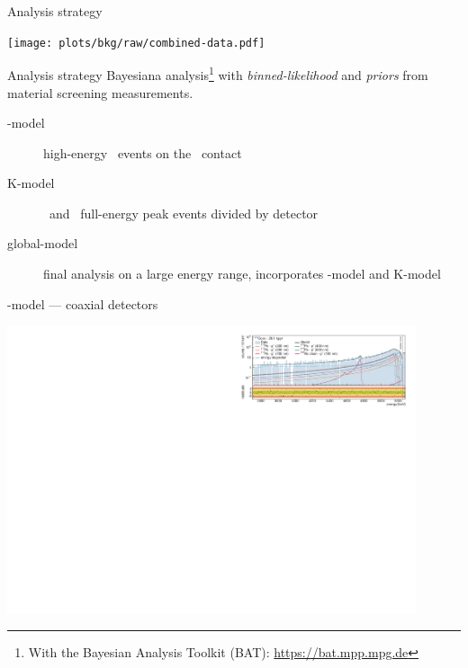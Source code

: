 \documentclass[10pt,aspectratio=169]{beamer}
\begin{document}
\begin{frame}{Analysis strategy}
  \begin{center}
    \texttt{[image: plots/bkg/raw/combined-data.pdf]}
  \end{center}
\end{frame}
\begin{frame}{Analysis strategy}
  \alert{Bayesiana} analysis\footnote{With the Bayesian Analysis Toolkit (BAT):
  \url{https://bat.mpp.mpg.de}} with \emph{binned-likelihood} and \emph{priors}
  from material screening measurements.
  \begin{description}
    \item[\a-model] high-energy \a\ events on the \pplus\ contact
    \item[K-model] \alert{\kvn\ and \kvz\ full-energy peak} events divided by detector
    \item[global-model] final analysis on a large energy range, incorporates \a-model and K-model
  \end{description}
\end{frame}
\begin{frame}{\a-model --- coaxial detectors}
  \begin{center}
    \includegraphics[width=0.9\textwidth]{plots/bkg/raw/ph2/results/amodel/amodel-enrCoax.pdf}
  \end{center}
\end{frame}
\end{document}
